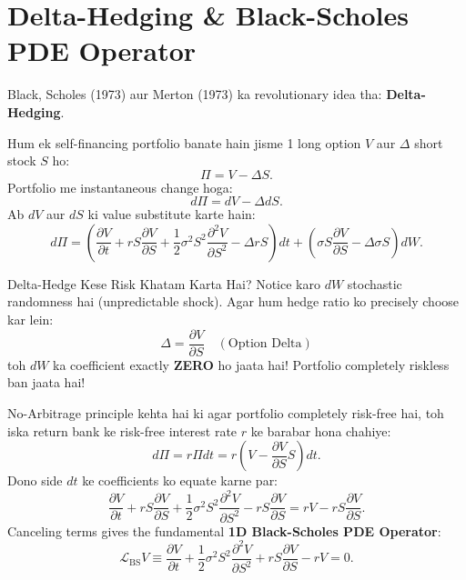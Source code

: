 \documentclass[11pt,a4paper,oneside]{book}
\begin{document}
\section{Delta-Hedging \& Black-Scholes PDE Operator}
Black, Scholes (1973) aur Merton (1973) ka revolutionary idea tha: \textbf{Delta-Hedging}.

Hum ek self-financing portfolio banate hain jisme 1 long option $V$ aur $\Delta$ short stock $S$ ho:
\begin{equation}
    \Pi = V - \Delta S.
\end{equation}
Portfolio me instantaneous change hoga:
\begin{equation}
    d\Pi = dV - \Delta dS.
\end{equation}
Ab $dV$ aur $dS$ ki value substitute karte hain:
\begin{equation}
    d\Pi = \left( \frac{\partial V}{\partial t} + rS \frac{\partial V}{\partial S} + \frac{1}{2}\sigma^2 S^2 \frac{\partial^2 V}{\partial S^2} - \Delta r S \right) dt + \left( \sigma S \frac{\partial V}{\partial S} - \Delta \sigma S \right) dW.
\end{equation}

\begin{intuitionbox}{Delta-Hedge Kese Risk Khatam Karta Hai?}
Notice karo $dW$ stochastic randomness hai (unpredictable shock). Agar hum hedge ratio ko precisely choose kar lein:
\begin{equation}
    \Delta = \frac{\partial V}{\partial S} \quad (\text{Option Delta})
\end{equation}
toh $dW$ ka coefficient exactly \textbf{ZERO} ho jaata hai! Portfolio completely riskless ban jaata hai!
\end{intuitionbox}

No-Arbitrage principle kehta hai ki agar portfolio completely risk-free hai, toh iska return bank ke risk-free interest rate $r$ ke barabar hona chahiye:
\begin{equation}
    d\Pi = r \Pi dt = r \left( V - \frac{\partial V}{\partial S} S \right) dt.
\end{equation}
Dono side $dt$ ke coefficients ko equate karne par:
\begin{equation}
    \frac{\partial V}{\partial t} + rS \frac{\partial V}{\partial S} + \frac{1}{2}\sigma^2 S^2 \frac{\partial^2 V}{\partial S^2} - rS \frac{\partial V}{\partial S} = rV - rS \frac{\partial V}{\partial S}.
\end{equation}
Canceling terms gives the fundamental \textbf{1D Black-Scholes PDE Operator}:
\begin{equation}
    \boxed{\mathcal{L}_{\text{BS}} V \equiv \frac{\partial V}{\partial t} + \frac{1}{2}\sigma^2 S^2 \frac{\partial^2 V}{\partial S^2} + rS \frac{\partial V}{\partial S} - rV = 0.}
\end{equation}
\end{document}
